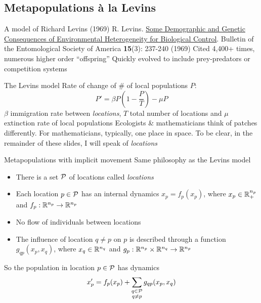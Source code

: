 \documentclass[aspectratio=43]{beamer}
\begin{document}
\subsection[Implicit movement]{Metapopulations \`a la Levins}

\begin{frame}{A model of Richard Levins (1969)}
    R. Levins. \href{https://doi.org/10.1093/besa/15.3.237}{Some Demographic and Genetic Consequences of Environmental Heterogeneity for Biological Control}. 
    Bulletin of the Entomological Society of America \textbf{15}(3): 237-240 (1969)
    \vfill
    Cited 4,400+ times, numerous higher order ``offspring''
	\vfill
	Quickly evolved to include prey-predators or competition systems
\end{frame}

\begin{frame}{The Levins model}
Rate of change of \# of local populations $P$:
\begin{equation}
P' = \beta P \left( 1 - \frac{P}{T} \right) -\mu P
\label{eq:Levins}
\end{equation}
$\beta$ immigration rate between \emph{locations}, $T$ total number of locations and $\mu$ extinction rate of local populations
\vfill
Ecologists \& mathematicians think of patches differently. For mathematicians, typically, one place in space. To be clear, in the remainder of these slides, I will speak of \emph{locations}
\end{frame}

\begin{frame}{Metapopulations with implicit movement}
    Same philosophy as the Levins model
    \vfill
    \begin{itemize}
        \item There is a set $\P$ of locations called \emph{locations}
        \item Each location $p\in\P$ has an internal dynamics $x_p=f_p(x_p)$, where $x_p\in\IR_+^{n_p}$ and $f_p:\IR^{n_p}\to \IR^{n_p}$
        \item No flow of individuals between locations
        \item The influence of location $q\neq p$ on $p$ is described through a function $g_{qp}(x_p,x_q)$, where $x_q\in\IR^{n_q}$ and $g_p:\IR^{n_p}\times\IR^{n_q}\to\IR^{n_p}$
    \end{itemize}
    \vfill
    So the population in location $p\in\P$ has dynamics
    \begin{equation}\label{eq:metapop_implicit_mvt_generic}
        x_p' = f_p(x_p)
        +\sum\dind{q\in\P}{q\neq p}
        g_{qp}(x_p,x_q)
    \end{equation}
\end{frame}
\end{document}
